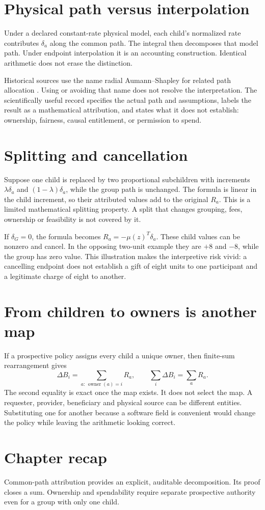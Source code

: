 \section{Physical path versus interpolation}
Under a declared constant-rate physical model, each child's normalized
rate contributes $\delta_a$ along the common path. The integral then
decomposes that model path. Under endpoint interpolation it is an accounting
construction. Identical arithmetic does not erase the distinction.

Historical sources use the name radial Aumann--Shapley for related path
allocation \cite{foundation}. Using or avoiding that name does not resolve
the interpretation. The scientifically useful record specifies the actual
path and assumptions, labels the result as a mathematical attribution, and
states what it does not establish: ownership, fairness, causal entitlement,
or permission to spend.

\section{Splitting and cancellation}
Suppose one child is replaced by two proportional subchildren with increments
$\lambda\delta_a$ and $(1-\lambda)\delta_a$, while the group path is
unchanged. The formula is linear in the child increment, so their attributed
values add to the original $R_a$. This is a limited mathematical splitting
property. A split that changes grouping, fees, ownership or feasibility is
not covered by it.

If $\delta_G=0$, the formula becomes $R_a=-\mu(z)^T\delta_a$.
These child values can be nonzero and cancel. In the opposing two-unit
example they are $+8$ and $-8$, while the group has zero value. This
illustration makes the interpretive risk vivid: a cancelling endpoint does
not establish a gift of eight units to one participant and a legitimate
charge of eight to another.

\section{From children to owners is another map}
If a prospective policy assigns every child a unique owner, then finite-sum
rearrangement gives
\begin{equation}
 \Delta B_i=\sum_{a:\,\operatorname{owner}(a)=i}R_a,
 \qquad \sum_i\Delta B_i=\sum_aR_a.
\end{equation}
The second equality is exact once the map exists. It does not select the
map. A requester, provider, beneficiary and physical source can be different
entities. Substituting one for another because a software field is convenient
would change the policy while leaving the arithmetic looking correct.

\section*{Chapter recap}
Common-path attribution provides an explicit, auditable decomposition. Its
proof closes a sum. Ownership and spendability require separate prospective
authority even for a group with only one child.
